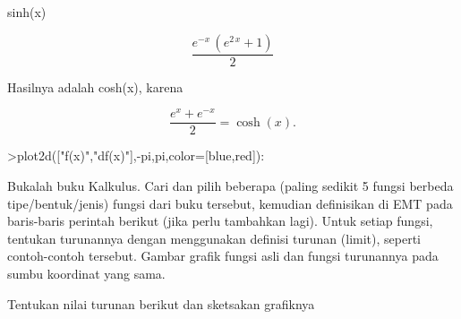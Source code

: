 \documentclass{article}
\begin{document}
\begin{eulernotebook}
\begin{eulercomment}
\begin{eulercomment}
\begin{eulercomment}
\begin{eulercomment}
\begin{eulercomment}
\begin{eulercomment}
\begin{euleroutput}
                                 sinh(x)
  
\end{euleroutput}
\begin{eulerformula}
\[
\frac{e^ {- x }\,\left(e^{2\,x}+1\right)}{2}
\]
\end{eulerformula}
\begin{eulercomment}
Hasilnya adalah cosh(x), karena

\end{eulercomment}
\begin{eulerformula}
\[
\frac{e^x+e^{-x}}{2}=\cosh(x).
\]
\end{eulerformula}
\begin{eulerprompt}
>plot2d(["f(x)","df(x)"],-pi,pi,color=[blue,red]):
\end{eulerprompt}
\begin{eulercomment}
Bukalah buku Kalkulus. Cari dan pilih beberapa (paling sedikit 5
fungsi berbeda tipe/bentuk/jenis) fungsi dari buku tersebut, kemudian
definisikan di EMT pada baris-baris perintah berikut (jika perlu
tambahkan lagi). Untuk setiap fungsi, tentukan turunannya dengan
menggunakan definisi turunan (limit), seperti contoh-contoh tersebut.
Gambar grafik fungsi asli dan fungsi turunannya pada sumbu koordinat
yang sama.

\end{eulercomment}
\eulersubheading{}
\begin{eulercomment}
Tentukan nilai turunan berikut dan sketsakan grafiknya


\end{eulercomment}
\end{eulercomment}
\end{eulercomment}
\end{eulercomment}
\end{eulercomment}
\end{eulercomment}
\end{eulercomment}
\end{eulernotebook}
\end{document}

